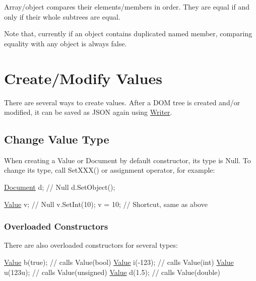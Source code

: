 Array/object compares their elements/members in order. They are equal if and only if their whole subtrees are equal.

Note that, currently if an object contains duplicated named member, comparing equality with any object is always {\ttfamily false}.\hypertarget{md_Cadriciel_Commun_Externe_RapidJSON_doc_tutorial.zh-cn_CreateModifyValues}{}\section{Create/\+Modify Values}\label{md_Cadriciel_Commun_Externe_RapidJSON_doc_tutorial.zh-cn_CreateModifyValues}
There are several ways to create values. After a D\+OM tree is created and/or modified, it can be saved as J\+S\+ON again using {\ttfamily \hyperlink{class_writer}{Writer}}.\hypertarget{md_Cadriciel_Commun_Externe_RapidJSON_doc_tutorial.zh-cn_ChangeValueType}{}\subsection{Change Value Type}\label{md_Cadriciel_Commun_Externe_RapidJSON_doc_tutorial.zh-cn_ChangeValueType}
When creating a Value or Document by default constructor, its type is Null. To change its type, call {\ttfamily Set\+X\+X\+X()} or assignment operator, for example\+:


\begin{DoxyCode}
\hyperlink{class_generic_document}{Document} d; \textcolor{comment}{// Null}
d.SetObject();

\hyperlink{class_generic_value}{Value} v;    \textcolor{comment}{// Null}
v.SetInt(10);
v = 10;     \textcolor{comment}{// Shortcut, same as above}
\end{DoxyCode}


\subsubsection*{Overloaded Constructors}

There are also overloaded constructors for several types\+:


\begin{DoxyCode}
\hyperlink{class_generic_value}{Value} b(\textcolor{keyword}{true});    \textcolor{comment}{// calls Value(bool)}
\hyperlink{class_generic_value}{Value} i(-123);    \textcolor{comment}{// calls Value(int)}
\hyperlink{class_generic_value}{Value} u(123u);    \textcolor{comment}{// calls Value(unsigned)}
\hyperlink{class_generic_value}{Value} d(1.5);     \textcolor{comment}{// calls Value(double)}
\end{DoxyCode}


